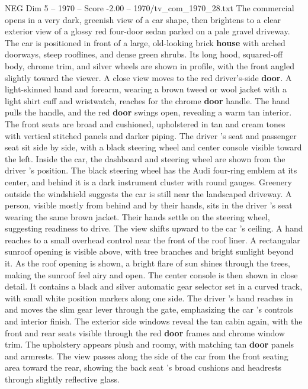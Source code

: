 \begin{textsample}{NEG Dim 5 – 1970 – Score -2.00 – 1970/tv\_com\_1970\_28.txt}  \label{ex:f5_neg_002}
The commercial opens in a very dark, greenish view of a car shape, then brightens to a clear exterior view of a glossy red four-door sedan parked on a pale gravel driveway.
The car is positioned in front of a large, old-looking brick \textbf{house} with arched doorways, steep rooflines, and dense green shrubs.
Its long hood, squared-off body, chrome trim, and silver wheels are shown in profile, with the front angled slightly toward the viewer.
A close view moves to the red driver’s-side \textbf{door}.
A light-skinned hand and forearm, wearing a brown tweed or wool jacket with a light shirt cuff and wristwatch, reaches for the chrome \textbf{door} handle.
The hand pulls the handle, and the red \textbf{door} swings open, revealing a warm tan interior.
The front seats are broad and cushioned, upholstered in tan and cream tones with vertical stitched panels and darker piping.
The driver ’s seat and passenger seat sit side by side, with a black steering wheel and center console visible toward the left.
Inside the car, the dashboard and steering wheel are shown from the driver ’s position.
The black steering wheel has the Audi four-ring emblem at its center, and behind it is a dark instrument cluster with round gauges.
Greenery outside the windshield suggests the car is still near the landscaped driveway.
A person, visible mostly from behind and by their hands, sits in the driver ’s seat wearing the same brown jacket.
Their hands settle on the steering wheel, suggesting readiness to drive.
The view shifts upward to the car ’s ceiling.
A hand reaches to a small overhead control near the front of the roof liner.
A rectangular sunroof opening is visible above, with tree branches and bright sunlight beyond it.
As the roof opening is shown, a bright flare of sun shines through the trees, making the sunroof feel airy and open.
The center console is then shown in close detail.
It contains a black and silver automatic gear selector set in a curved track, with small white position markers along one side.
The driver ’s hand reaches in and moves the slim gear lever through the gate, emphasizing the car ’s controls and interior finish.
The exterior side windows reveal the tan cabin again, with the front and rear seats visible through the red \textbf{door} frames and chrome window trim.
The upholstery appears plush and roomy, with matching tan \textbf{door} panels and armrests.
The view passes along the side of the car from the front seating area toward the rear, showing the back seat ’s broad cushions and headrests through slightly reflective glass.

\end{textsample}
